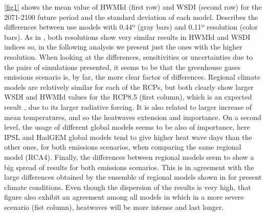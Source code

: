 \ref{fig1} shows the mean value of HWMId (first row) and WSDI (second row) for the 2071-2100 future period and the standard deviation of each model. Describes the differences between use models with 0.44º (gray bars) and 0.11º resolution (color bars). As in \cite{Pla_Kys2019}, both resolutions show very similar results in HWMId  and WSDI indices so, in the following analysis we present just the ones with the higher resolution. When looking at the differences, sensitivities or uncertainties due to the pairs of simulations presented, it seems to be that the greenhouse gases emissions
scenario is, by far, the more clear factor of differences. Regional climate
models are relatively similar for each of the RCPs, but both clearly show larger
WSDI and HWMId values for the RCP8.5 (first column), which is an expected result \cite{lho_al2018}, due to its larger
radiative forcing. It is also related to larger increase of mean temperatures, and
so the heatwaves extension and importance. On a second level, the usage
of different global models seems to be also of importance, here IPSL and HadGEM global models
tend to give higher heat wave days than the other ones, for both emissions
scenarios, when comparing the same regional model (RCA4). Finally, the differences
between regional models seem to show a big spread of results for both
emissions scenarios. This is in agreement with the large differences obtained by the
ensemble of regional models shown in \cite{vau_al2013} for present climate
conditions.
Even though the dispersion of the results is very high, that figure also exhibit an agreement among all models in which in a more severe scenario (fist column), heatwaves will be more intense \cite{ouz_al2016} and last longer. 

